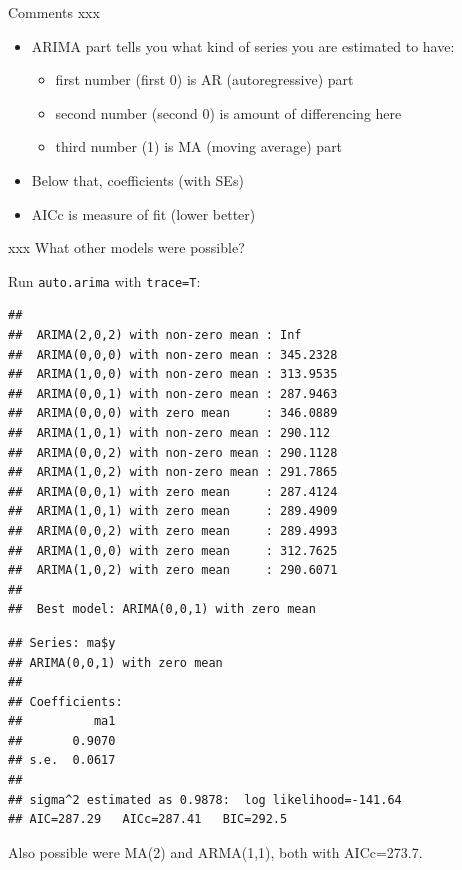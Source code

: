 \documentclass[ignorenonframetext,]{beamer}
\newenvironment{Shaded}{\begin{snugshade}}{\end{snugshade}}
\newcommand{\DataTypeTok}[1]{\textcolor[rgb]{0.13,0.29,0.53}{#1}}
\newcommand{\KeywordTok}[1]{\textcolor[rgb]{0.13,0.29,0.53}{\textbf{#1}}}
\newcommand{\NormalTok}[1]{#1}
\newcommand{\OperatorTok}[1]{\textcolor[rgb]{0.81,0.36,0.00}{\textbf{#1}}}
\providecommand{\tightlist}{%
  \setlength{\itemsep}{0pt}\setlength{\parskip}{0pt}}
\begin{document}
\begin{frame}{Comments xxx}
\protect\hypertarget{comments-xxx-1}{}

\begin{itemize}
\tightlist
\item
  ARIMA part tells you what kind of series you are estimated to have:

  \begin{itemize}
  \tightlist
  \item
    first number (first 0) is AR (autoregressive) part
  \item
    second number (second 0) is amount of differencing here
  \item
    third number (1) is MA (moving average) part
  \end{itemize}
\item
  Below that, coefficients (with SEs)
\item
  AICc is measure of fit (lower better)
\end{itemize}

\end{frame}

\begin{frame}[fragile]{xxx What other models were possible?}
\protect\hypertarget{xxx-what-other-models-were-possible}{}

Run \texttt{auto.arima} with \texttt{trace=T}:

\small

\begin{Shaded}
\end{Shaded}

\begin{verbatim}
## 
##  ARIMA(2,0,2) with non-zero mean : Inf
##  ARIMA(0,0,0) with non-zero mean : 345.2328
##  ARIMA(1,0,0) with non-zero mean : 313.9535
##  ARIMA(0,0,1) with non-zero mean : 287.9463
##  ARIMA(0,0,0) with zero mean     : 346.0889
##  ARIMA(1,0,1) with non-zero mean : 290.112
##  ARIMA(0,0,2) with non-zero mean : 290.1128
##  ARIMA(1,0,2) with non-zero mean : 291.7865
##  ARIMA(0,0,1) with zero mean     : 287.4124
##  ARIMA(1,0,1) with zero mean     : 289.4909
##  ARIMA(0,0,2) with zero mean     : 289.4993
##  ARIMA(1,0,0) with zero mean     : 312.7625
##  ARIMA(1,0,2) with zero mean     : 290.6071
## 
##  Best model: ARIMA(0,0,1) with zero mean
\end{verbatim}

\begin{verbatim}
## Series: ma$y 
## ARIMA(0,0,1) with zero mean 
## 
## Coefficients:
##          ma1
##       0.9070
## s.e.  0.0617
## 
## sigma^2 estimated as 0.9878:  log likelihood=-141.64
## AIC=287.29   AICc=287.41   BIC=292.5
\end{verbatim}

\normalsize

Also possible were MA(2) and ARMA(1,1), both with AICc=273.7.

\end{frame}
\end{document}

